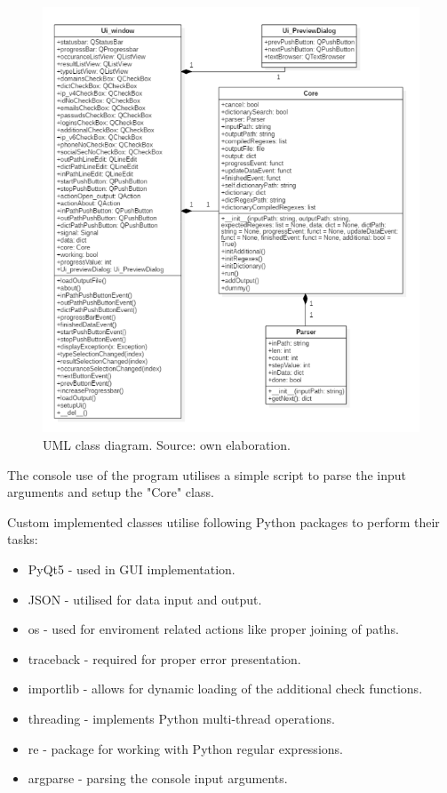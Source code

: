 \documentclass[a4paper,twoside,12pt]{book}
\begin{document}
\begin{figure}
   \centering
   \includegraphics{Images/DiagramUML}
   \caption{UML class diagram. Source: own elaboration.}
   \label{fig:UMLdiagram}
\end{figure}

The console use of the program utilises a simple script to parse the input arguments and setup the "Core" class.

Custom implemented classes utilise following Python packages to perform their tasks: 

\begin{itemize}
   \item PyQt5 - used in GUI implementation.
   \item JSON - utilised for data input and output.
   \item os - used for enviroment related actions like proper joining of paths.
   \item traceback - required for proper error presentation.
   \item importlib - allows for dynamic loading of the additional check functions.
   \item threading - implements Python multi-thread operations.
   \item re - package for working with Python regular expressions.
   \item argparse - parsing the console input arguments.
\end{itemize}
\end{document}
